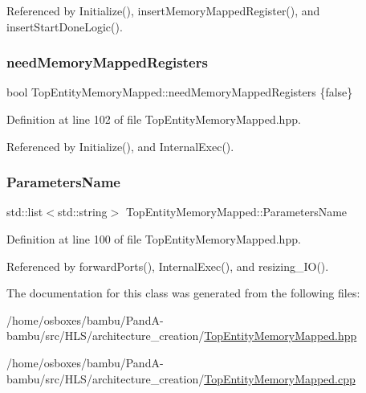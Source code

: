Referenced by Initialize(), insert\+Memory\+Mapped\+Register(), and insert\+Start\+Done\+Logic().

\mbox{\label{classTopEntityMemoryMapped_a07bad75b9cd36d3c1148b0872a09d974}} 
\subsubsection{\texorpdfstring{need\+Memory\+Mapped\+Registers}{needMemoryMappedRegisters}}
{\footnotesize\ttfamily bool Top\+Entity\+Memory\+Mapped\+::need\+Memory\+Mapped\+Registers \{false\}\hspace{0.3cm}{\ttfamily [private]}}



Definition at line 102 of file Top\+Entity\+Memory\+Mapped.\+hpp.



Referenced by Initialize(), and Internal\+Exec().

\mbox{\label{classTopEntityMemoryMapped_ad6fe502daf2be3bfce8ed230d6c80685}} 
\subsubsection{\texorpdfstring{Parameters\+Name}{ParametersName}}
{\footnotesize\ttfamily std\+::list$<$std\+::string$>$ Top\+Entity\+Memory\+Mapped\+::\+Parameters\+Name\hspace{0.3cm}{\ttfamily [private]}}



Definition at line 100 of file Top\+Entity\+Memory\+Mapped.\+hpp.



Referenced by forward\+Ports(), Internal\+Exec(), and resizing\+\_\+\+I\+O().



The documentation for this class was generated from the following files\+:\begin{DoxyCompactItemize}
\item 
/home/osboxes/bambu/\+Pand\+A-\/bambu/src/\+H\+L\+S/architecture\+\_\+creation/\hyperlink{TopEntityMemoryMapped_8hpp}{Top\+Entity\+Memory\+Mapped.\+hpp}\item 
/home/osboxes/bambu/\+Pand\+A-\/bambu/src/\+H\+L\+S/architecture\+\_\+creation/\hyperlink{TopEntityMemoryMapped_8cpp}{Top\+Entity\+Memory\+Mapped.\+cpp}\end{DoxyCompactItemize}
